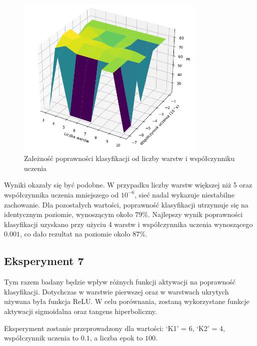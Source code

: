 \documentclass[a4paper]{article}
\begin{document}
\begin{figure}[H]
    \centering
    \includegraphics[width=0.8\textwidth, keepaspectratio]{pictures/LR_LAYERS_1500_1000K1K2.PNG}
    \caption{Zależność poprawności klasyfikacji od liczby warstw i współczynniku uczenia}
    \label{fig:lr_layers_3}
\end{figure}

Wyniki okazały się być podobne.
W przypadku liczby warstw większej niż 5 oraz współczynnika uczenia mniejszego od $10^{-6}$, sieć nadal wykazuje niestabilne zachowanie.
Dla pozostałych wartości, poprawność klasyfikacji utrzymuje się na identycznym poziomie, wynoszącym około $79\%$.
Najlepszy wynik poprawności klasyfikacji uzyskano przy użyciu 4 warstw i współczynnika uczenia wynoszącego $0.001$, co dało rezultat na poziomie około $87\%$.

\newpage
\subsection{Eksperyment 7}
Tym razem badany będzie wpływ różnych funkcji aktywacji na poprawność klasyfikacji.
Dotychczas w warstwie pierwszej oraz w warstwach ukrytych używana była funkcja ReLU.
W celu porównania, zostaną wykorzystane funkcje aktywacji sigmoidalna oraz tangens hiperboliczny.

Eksperyment zostanie przeprowadzony dla wartości: `K1' = 6, `K2' = 4, współczynnik uczenia to $0.1$, a liczba epok to $100$.
\end{document}
